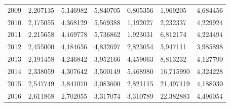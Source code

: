 \begin{table}
\begin{tabular}{p{1cm}p{2cm}p{2cm}p{2cm}p{2cm}p{2cm}p{2cm}}
 2009 &                            2,207135 &                      5,146982 &                                5,840705 &          0,805356 &                      1,969205 &                    4,684456 \\
 2010 &                            2,175055 &                      4,368129 &                                5,569388 &          1,192027 &                      2,232337 &                    4,229924 \\
 2011 &                            2,215658 &                      4,469778 &                                5,736862 &          1,923031 &                      6,812174 &                    4,224494 \\
 2012 &                            2,455000 &                      4,184656 &                                4,832697 &          2,823054 &                      5,947111 &                    3,985898 \\
 2013 &                            2,191458 &                      4,246842 &                                3,952166 &          4,459063 &                      8,813232 &                    4,127790 \\
 2014 &                            2,338059 &                      4,307642 &                                3,500149 &          5,468980 &                     16,715990 &                    4,324228 \\
 2015 &                            2,547749 &                      3,841070 &                                3,083600 &          2,821115 &                     21,497119 &                    4,188030 \\
 2016 &                            2,611868 &                      2,702055 &                                3,317074 &          3,310789 &                     22,382883 &                    4,496054 \\
\bottomrule
\end{tabular}
\end{table}
